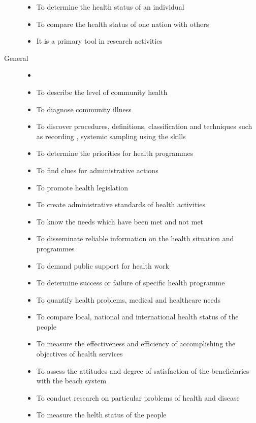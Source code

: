 \documentclass[
10pt, %
a4paper, %
]{report}
\begin{document}
\begin{description}
\begin{itemize}
\item To determine the health status of an individual
\item To compare the health status of one nation with others
\item It is a primary tool in research activities
\end{itemize}
\item[General]
\begin{itemize}
\item[]
\item To describe the level of community health
\item To diagnose community illness
\item To discover procedures, definitions, classification and techniques such as recording , systemic sampling using the skills
\item To determine the priorities for health programmes
\item To find clues for administrative actions
\item To promote health legislation
\item To create administrative standards of health activities
\item To know the needs which have been met and not met
\item To disseminate reliable information on the health situation and programmes
\item To demand public support for health work
\item To determine success or failure of specific health programme
\item To quantify health problems, medical and healthcare needs
\item To compare local, national and international health status of the people
\item To measure the effectiveness and efficiency of accomplishing the objectives of health services
\item To assess the attitudes and degree of satisfaction of the beneficiaries with the beach system
\item To conduct research on particular problems of health and disease
\item To measure the helth status of the people
\end{itemize}
\end{description}
\end{document}
